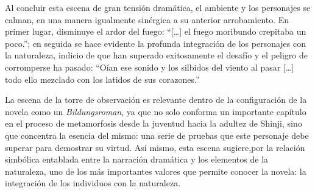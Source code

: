 Al concluir esta escena de gran tensión dramática, el ambiente y los personajes se calman, en una manera igualmente sinérgica a su anterior arrobamiento. En primer lugar, disminuye el ardor del fuego: ``[\ldots] el fuego moribundo crepitaba un poco.''\autocite{mishima2006}; en seguida se hace evidente la profunda integración de los personajes con la naturaleza, indicio de que han superado exitosamente el desafío y el peligro de corromperse ha pasado: ``Oían ese sonido y los silbidos del viento al pasar [\ldots] todo ello mezclado con los latidos de sus corazones.''\autocite{mishima2006}

La escena de la torre de observación es relevante dentro de la configuración de la novela como un \emph{Bildungsroman}, ya que no solo conforma un importante capítulo en el proceso de metamorfosis desde la juventud hacia la adultez de Shinji, sino que concentra la esencia del mismo: una serie de pruebas que este personaje debe superar para demostrar su virtud. Así mismo, esta escena sugiere,por la relación simbólica entablada  entre la narración dramática y los elementos de la naturaleza, uno de los más importantes valores que permite conocer la novela: la integración de los individuos con la naturaleza. 
